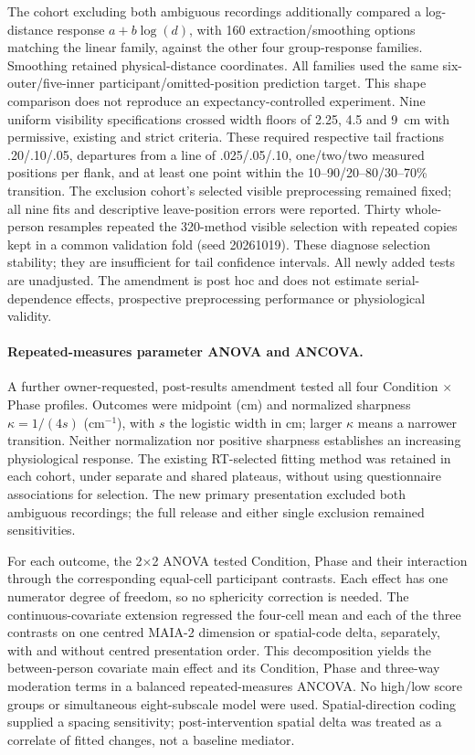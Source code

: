 The cohort excluding both ambiguous recordings additionally compared a log-distance response $a+b\log(d)$, with 160 extraction/smoothing options matching the linear family, against the other four group-response families. Smoothing retained physical-distance coordinates. All families used the same six-outer/five-inner participant/omitted-position prediction target. This shape comparison does not reproduce an expectancy-controlled experiment. Nine uniform visibility specifications crossed width floors of 2.25, 4.5 and 9~cm with permissive, existing and strict criteria. These required respective tail fractions .20/.10/.05, departures from a line of .025/.05/.10, one/two/two measured positions per flank, and at least one point within the 10--90/20--80/30--70\% transition. The exclusion cohort's selected visible preprocessing remained fixed; all nine fits and descriptive leave-position errors were reported. Thirty whole-person resamples repeated the 320-method visible selection with repeated copies kept in a common validation fold (seed 20261019). These diagnose selection stability; they are insufficient for tail confidence intervals. All newly added tests are unadjusted. The amendment is post hoc and does not estimate serial-dependence effects, prospective preprocessing performance or physiological validity.


\paragraph{Repeated-measures parameter ANOVA and ANCOVA.}
A further owner-requested, post-results amendment tested all four Condition $\times$ Phase profiles. Outcomes were midpoint (cm) and normalized sharpness $\kappa=1/(4s)$ (cm$^{-1}$), with $s$ the logistic width in cm; larger $\kappa$ means a narrower transition. Neither normalization nor positive sharpness establishes an increasing physiological response. The existing RT-selected fitting method was retained in each cohort, under separate and shared plateaus, without using questionnaire associations for selection. The new primary presentation excluded both ambiguous recordings; the full release and either single exclusion remained sensitivities.

For each outcome, the 2$\times$2 ANOVA tested Condition, Phase and their interaction through the corresponding equal-cell participant contrasts. Each effect has one numerator degree of freedom, so no sphericity correction is needed. The continuous-covariate extension regressed the four-cell mean and each of the three contrasts on one centred MAIA-2 dimension or spatial-code delta, separately, with and without centred presentation order. This decomposition yields the between-person covariate main effect and its Condition, Phase and three-way moderation terms in a balanced repeated-measures ANCOVA. No high/low score groups or simultaneous eight-subscale model were used. Spatial-direction coding supplied a spacing sensitivity; post-intervention spatial delta was treated as a correlate of fitted changes, not a baseline mediator.

